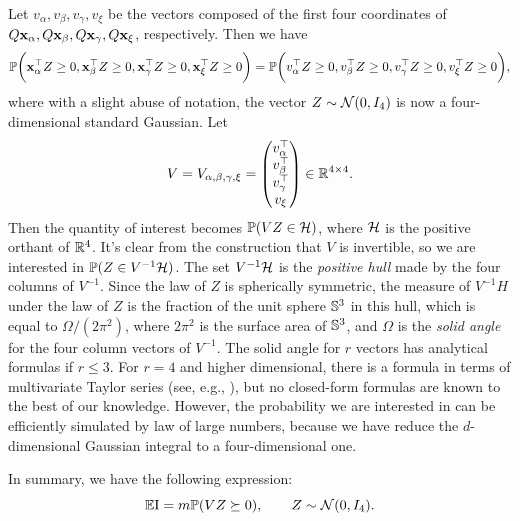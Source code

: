 Let $v_\alpha, v_\beta, v_\gamma, v_\xi$ be the vectors composed of the first four coordinates of $Q{\mathbf{x}}_\alpha, Q{\mathbf{x}}_\beta, Q{\mathbf{x}}_\gamma, Q{\mathbf{x}}_\xi$, respectively. Then we have
\[
	{\mathbb{P}} \bigg({\mathbf{x}}_\alpha^\top Z \geq 0,{\mathbf{x}}_\beta^\top Z \geq 0,{\mathbf{x}}_\gamma^\top Z \geq 0,{\mathbf{x}}_\xi^\top Z \geq 0\bigg) = {\mathbb{P}} \bigg(v_\alpha^\top Z \geq 0, v_\beta^\top Z \geq 0, v_\gamma^\top Z \geq 0, v_\xi^\top Z \geq 0\bigg),
\]
where with a slight abuse of notation, the vector $Z\sim{\mathcal{N}}(0, I_4)$ is now a four-dimensional standard Gaussian. Let
\begin{equation}
	\label{eq: supporting_vectors_in_four_dim}
	V =  V_{\alpha, \beta, \gamma, \xi} = 
	\begin{pmatrix}
		v_\alpha^\top \\
		v_\beta^\top \\
		v_\gamma^\top \\
		v_\xi
	\end{pmatrix} \in {\mathbb{R}}^{4\times 4}.
\end{equation}	
Then the quantity of interest becomes ${\mathbb{P}}(VZ \in {\mathcal{H}})$, where ${\mathcal{H}}$ is the positive orthant of ${\mathbb{R}}^4$. It's clear from the construction that $V$ is invertible, so we are interested in ${\mathbb{P}}(Z\in V^{-1}{\mathcal{H}})$. The set $V^{-1}{\mathcal{H}}$ is the \emph{positive hull} made by the four columns of $V^{-1}$. Since the law of $Z$ is spherically symmetric, the measure of $V^{-1}H$ under the law of $Z$ is the fraction of the unit sphere ${\mathbb{S}}^3$  in this hull, which is equal to $\Omega/(2\pi^2)$, where $2\pi^2$ is the surface area of ${\mathbb{S}}^3$, and $\Omega$ is the \emph{solid angle} for the four column vectors of $V^{-1}$. The solid angle for $r$ vectors has analytical formulas if $r \leq 3$. For $r = 4$ and higher dimensional, there is a formula in terms of multivariate Taylor series (see, e.g., \citealt{aomoto1977analytic,ribando2006measuring}), but no closed-form formulas are known to the best of our knowledge. However, the probability we are interested in can be efficiently simulated by law of large numbers, because we have reduce the $d$-dimensional Gaussian integral to a four-dimensional one. 

In summary, we have the following expression:
\[
	\bbE \RN{1} = m \bbP(V Z \succeq 0), \qquad Z\sim\calN(0, I_4).
\]
~\\

